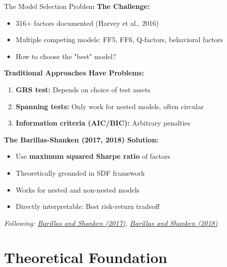 \documentclass{beamer}
\begin{document}
\begin{frame}{The Model Selection Problem}
    \textbf{The Challenge:}
    \begin{itemize}
        \item 316+ factors documented (Harvey et al., 2016)
        \item Multiple competing models: FF5, FF6, Q-factors, behavioral factors
        \item How to choose the "best" model?
    \end{itemize}
    
    \vspace{0.3cm}
    \textbf{Traditional Approaches Have Problems:}
    \begin{enumerate}
        \item \textbf{GRS test:} Depends on choice of test assets
        \item \textbf{Spanning tests:} Only work for nested models, often circular
        \item \textbf{Information criteria (AIC/BIC):} Arbitrary penalties
    \end{enumerate}
    
    \vspace{0.3cm}
    \textbf{The Barillas-Shanken (2017, 2018) Solution:}
    \begin{itemize}
        \item Use \textbf{maximum squared Sharpe ratio} of factors
        \item Theoretically grounded in SDF framework
        \item Works for nested and non-nested models
        \item Directly interpretable: Best risk-return tradeoff
    \end{itemize}
    
    
    \textit{Following: \textcolor{blue}{\href{https://doi.org/10.1093/rfs/hhx182}{Barillas and Shanken (2017)}}, \textcolor{blue}{\href{https://doi.org/10.1093/rfs/hhz089}{Barillas and Shanken (2018)}}}
\end{frame}

\section{Theoretical Foundation}
\end{document}
